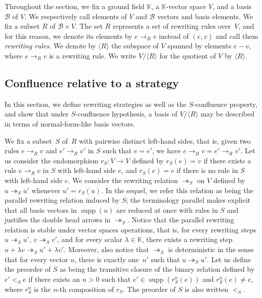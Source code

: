 \documentclass[11pt]{article}
\theoremstyle{definition}
\newcommand\basis{\mathscr{B}}
\newcommand\ordS{<_S}
\DeclareMathOperator{\supp}{supp}
\newcommand\K{\mathbb{K}}
\newcommand\Span[1]{\langle #1\rangle}
\newcommand\rewR{\to_R}
\newcommand\parS{\twoheadrightarrow_S}
\begin{document}
Throughout the section, we fix a ground field $\K$, a $\K$-vector space $V$, and
a basis $\basis$ of $V$. We respectively call elements of $V$ and $\basis$
vectors and basis elements. We fix a subset $R$ of $\basis\times V$. The set $R$
represents a set of rewriting rules over~$V$, and for this reason, we denote its
elements by $e\rewR v$ instead of $(e,v)$ and call them \emph{rewriting
  rules}. We denote by $\Span{R}$ the subspace of $V$ spanned by elements $e-v$,
where $e\rewR v$ is a rewriting rule. We write $V/\Span{R}$ for the quotient of
$V$ by $\Span{R}$.

\subsection{Confluence relative to a strategy}
\label{sec:confluence_relative_to_a_strategy}

In this section, we define rewriting strategies as well as the $S$-confluence
property, and show that under $S$-confluence hypothesis, a basis of $V/\Span{R}$
may be described in terms of normal-form-like basis vectors.  \medskip


\medskip

We fix a subset~$S$ of~$R$ with pairwise distinct left-hand sides, that is,
given two rules $e\rewR v$ and $e'\rewR v'$ in $S$ such that $e=e'$, we have
$e\rewR v=e'\rewR v'$. Let us consider the endomorphism $r_S:V\to V$ defined by
$r_S(e)=v$ if there exists a rule $e\rewR v$ in $S$ with left-hand side $e$, and
$r_S(e)=e$ if there is no rule in $S$ with left-hand side $e$. We consider the
rewriting relation $\parS$ on $V$ defined by $u\parS u'$ whenever
$u'=r_S(u)$. In the sequel, we refer this relation as being the parallel
rewriting relation induced by $S$; the terminology parallel makes explicit that
all basis vectors in $\supp(u)$ are reduced at once with rules in $S$ and
justifies the double head arrows in $\parS$. Notice that the parallel rewriting
relation is stable under vector spaces operations, that is, for every rewriting
steps $u\parS u'$, $v\parS v'$, and for every scalar $\lambda\in\K$, there exists a
rewriting step $u+\lambda v\parS u'+\lambda v'$. Moreover, also notice that
$\parS$ is deterministic in the sense that for every vector $u$, there is
exactly one~$u'$ such that $u\parS u'$. Let us define the preorder of $S$ as
being the transitive closure of the binary relation defined by $e'\ordS e$ if
there exists an $n > 0$ such that $e'\in\supp(r_S^n(e))$ and $r_S^n(e) \neq e$, where
$r_S^n$ is the $n$-th composition of $r_S$. The preorder of $S$ is also
written $\ordS$.
\smallskip
\end{document}
